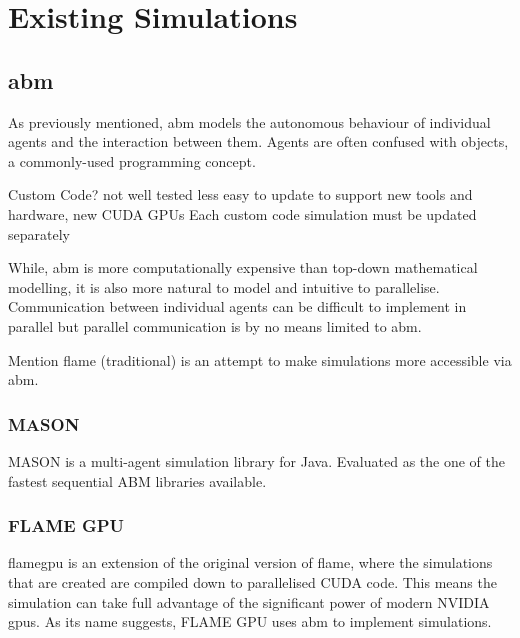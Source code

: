 \documentclass{UoYCSproject}
\begin{document}
\section{Existing Simulations}

\subsection{\acrlong{abm}}
\label{abm}
As previously mentioned, \gls{abm} models the autonomous behaviour of individual agents and the interaction between them.
Agents are often confused with objects, a commonly-used programming concept.


Custom Code?\cite{phil_diss}
	not well tested
	less easy to update to support new tools and hardware, new CUDA GPUs
		Each custom code simulation must be updated separately

While, \acrlong{abm} is more computationally expensive than top-down mathematical modelling, it is also more natural to model and intuitive to parallelise\cite{flame_simulation}.
Communication between individual agents can be difficult to implement in parallel but parallel communication is by no means limited to \gls{abm}.


Mention \acrshort{flame} (traditional) is an attempt to make simulations more accessible via \acrshort{abm}.


\subsubsection{\gls{MASON}}
\gls{MASON} is a multi-agent simulation library for Java.
Evaluated as the one of the fastest sequential ABM libraries available\cite{abm_platforms_review}.



\subsubsection{\gls{FLAME GPU}}
\acrfull{flamegpu} is an extension of the original version of \acrshort{flame}, where the simulations that are created are compiled down to parallelised CUDA code. This means the simulation can take full advantage of the significant power of modern NVIDIA \acrshort{gpu}s.
As its name suggests, \gls{FLAME GPU} uses \acrlong{abm} to implement simulations.
\end{document}
